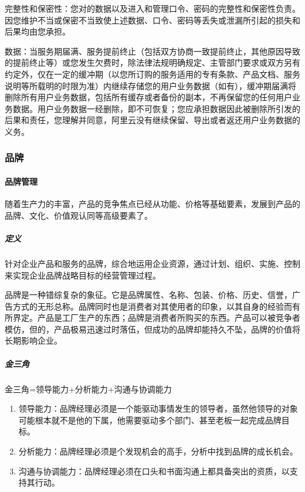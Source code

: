 \documentclass[letterpaper,10pt,english]{sphinxmanual}
\begin{document}
完整性和保密性：您对的数据以及进入和管理口令、密码的完整性和保密性负责。因您维护不当或保密不当致使上述数据、口令、密码等丢失或泄漏所引起的损失和后果均由您承担。

数据：当服务期届满、服务提前终止（包括双方协商一致提前终止，其他原因导致的提前终止等）或您发生欠费时，除法律法规明确规定、主管部门要求或双方另有约定外，仅在一定的缓冲期（以您所订购的服务适用的专有条款、产品文档、服务说明等所载明的时限为准）内继续存储您的用户业务数据（如有），缓冲期届满将删除所有用户业务数据，包括所有缓存或者备份的副本，不再保留您的任何用户业务数据。用户业务数据一经删除，即不可恢复；您应承担数据因此被删除所引发的后果和责任，您理解并同意，阿里云没有继续保留、导出或者返还用户业务数据的义务。


\subsubsection{品牌}
\label{\detokenize{chapter_idea/brand:id1}}\label{\detokenize{chapter_idea/brand::doc}}

\paragraph{品牌管理}
\label{\detokenize{chapter_idea/brand:id2}}
随着生产力的丰富，产品的竞争焦点已经从功能、价格等基础要素，发展到产品的品牌、文化、价值观认同等高级要素了。


\subparagraph{定义}
\label{\detokenize{chapter_idea/brand:id3}}
针对企业产品和服务的品牌，综合地运用企业资源，通过计划、组织、实施、控制来实现企业品牌战略目标的经营管理过程。

品牌是一种错综复杂的象征。它是品牌属性、名称、包装、价格、历史、信誉，广告方式的无形总称。品牌同时也是消费者对其使用者的印象，以其自身的经验而有所界定。产品是工厂生产的东西；品牌是消费者所购买的东西。产品可以被竞争者模仿，但的，产品极易迅速过时落伍，但成功的品牌却能持久不坠，品牌的价值将长期影响企业。


\subparagraph{金三角}
\label{\detokenize{chapter_idea/brand:id4}}
金三角=领导能力+分析能力+沟通与协调能力
\begin{enumerate}
%
\item {} 
领导能力：品牌经理必须是一个能驱动事情发生的领导者，虽然他领导的对象可能根本就不是他的下属，他需要驱动多个部门、甚至老板一起完成品牌目标。

\item {} 
分析能力：品牌经理必须是个发现机会的高手，分析中找到品牌的成长机会。

\item {} 
沟通与协调能力：品牌经理必须在口头和书面沟通上都具备突出的资质，以支持其行动。

\end{enumerate}
\end{document}
